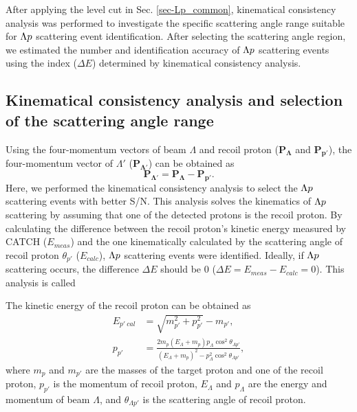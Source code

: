 After applying the  level cut in Sec. \ref{sec-Lp_common}, kinematical consistency analysis was performed to investigate the specific scattering angle range suitable for $\Lambda p$ scattering event identification. %
After selecting the scattering angle region, we estimated the number and identification accuracy of $\Lambda p$ scattering events using the index ($\Delta E$) determined by kinematical consistency analysis.

\subsection{Kinematical consistency analysis and selection of the scattering angle range}
\label{sec-2p_wo_kine}

Using the four-momentum vectors of beam $\Lambda$ and recoil proton ($\bm{P_{\Lambda}}$ and $\bm{P_{p'}}$), the four-momentum vector of $\Lambda'$ ($\bm{P_{\Lambda'}}$) can be obtained as 
\begin{equation}
  \bm{P_{\Lambda'}} = \bm{P_{\Lambda}} - \bm{P_{p'}}. 
\end{equation}
Here, we performed the kinematical consistency analysis to select the $\Lambda p$ scattering events with better S/N. This analysis solves the kinematics of $\Lambda p$ scattering by assuming that one of the detected protons is the recoil proton. By calculating the difference between the recoil proton's kinetic energy measured by CATCH ($E_{meas}$) and the one kinematically calculated by the scattering angle of recoil proton $\theta_{p'}$ ($E_{calc}$), $\Lambda p$ scattering events were identified. Ideally, if $\Lambda p$ scattering occurs, the difference $\Delta E$ should be 0 ($\Delta E = E_{meas} - E_{calc} = 0$). This analysis is called 

The kinetic energy of the recoil proton can be obtained as 
\begin{align}
  E_{p'\ cal} &= \sqrt{m_{p'}^{2} + p_{p'}^{2}} - m_{p'}, \\
  p_{p'} &= \frac{2m_{p}(E_{\Lambda} + m_{p})p_{\Lambda} \cos^{2}{\theta_{\Lambda p'}}} {(E_{\Lambda} + m_{p})^{2} - p_{\Lambda}^{2} \cos^{2}{\theta_{\Lambda p'}}},
  \label{eq-dE_recop}
\end{align}
where $m_{p}$ and $m_{p'}$ are the masses of the target proton and one of the recoil proton, $p_{p'}$ is the momentum of recoil proton, $E_{\Lambda}$ and $p_{\Lambda}$ are the energy and momentum of beam $\Lambda$, and $\theta_{\Lambda p'}$ is the scattering angle of recoil proton. 

